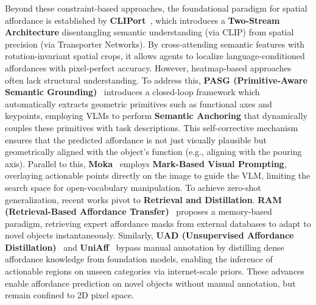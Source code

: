 \documentclass[acmsmall,screen,review,anonymous]{acmart}
\begin{document}
Beyond these constraint-based approaches, the foundational paradigm for spatial affordance is established by \textbf{CLIPort}~\cite{shridhar2021cliport}, which introduces a \textbf{Two-Stream Architecture} disentangling semantic understanding (via CLIP) from spatial precision (via Transporter Networks). By cross-attending semantic features with rotation-invariant spatial crops, it allows agents to localize language-conditioned affordances with pixel-perfect accuracy. However, heatmap-based approaches often lack structural understanding. To address this, \textbf{PASG (Primitive-Aware Semantic Grounding)}~\cite{zhu2025pasg} introduces a closed-loop framework which automatically extracts geometric primitives such as functional axes and keypoints, employing VLMs to perform \textbf{Semantic Anchoring} that dynamically couples these primitives with task descriptions. This self-corrective mechanism ensures that the predicted affordance is not just visually plausible but geometrically aligned with the object's function (e.g., aligning with the pouring axis). Parallel to this, \textbf{Moka}~\cite{moka2024} employs \textbf{Mark-Based Visual Prompting}, overlaying actionable points directly on the image to guide the VLM, limiting the search space for open-vocabulary manipulation. To achieve zero-shot generalization, recent works pivot to \textbf{Retrieval and Distillation}. \textbf{RAM (Retrieval-Based Affordance Transfer)}~\cite{ram2025} proposes a memory-based paradigm, retrieving expert affordance masks from external databases to adapt to novel objects instantaneously. Similarly, \textbf{UAD (Unsupervised Affordance Distillation)}~\cite{tang2025uad} and \textbf{UniAff}~\cite{uniaff2025} bypass manual annotation by distilling dense affordance knowledge from foundation models, enabling the inference of actionable regions on unseen categories via internet-scale priors. These advances enable affordance prediction on novel objects without manual annotation, but remain confined to 2D pixel space.
\end{document}

